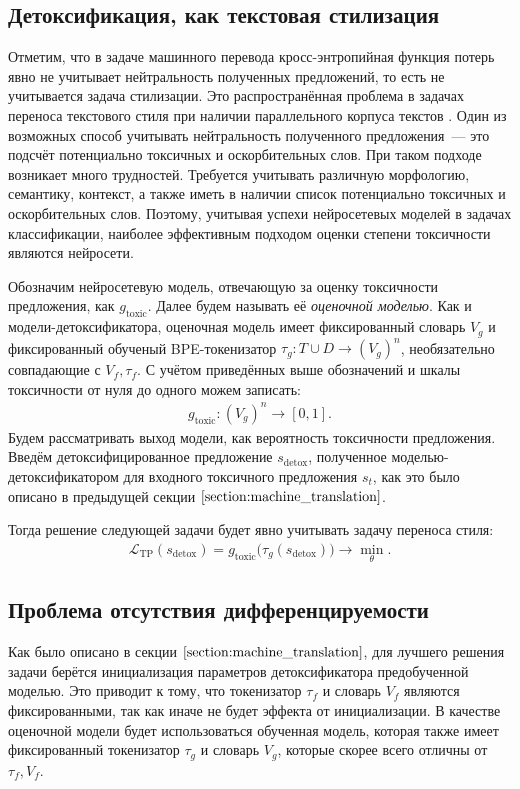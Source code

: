 \subsection{Детоксификация, как текстовая стилизация}
Отметим, что в задаче машинного перевода кросс-энтропийная функция потерь явно не учитывает нейтральность полученных предложений, то есть не учитывается задача стилизации.
Это распространённая проблема в задачах переноса текстового стиля при наличии параллельного корпуса текстов \cite{Tikhonov2018WhatIW}.
Один из возможных способ учитывать нейтральность полученного предложения~--- это подсчёт потенциально токсичных и оскорбительных слов. 
При таком подходе возникает много трудностей.
Требуется учитывать различную морфологию, семантику, контекст, а также иметь в наличии список потенциально токсичных и оскорбительных слов. 
Поэтому, учитывая успехи нейросетевых моделей в задачах классификации\cite{XLNet, devlin-etal-2019-bert}, наиболее эффективным подходом оценки степени токсичности являются нейросети.

Обозначим нейросетевую модель, отвечающую за оценку токсичности предложения, как $g_{\text{toxic}}$.
Далее будем называть её \textit{оценочной моделью}.
Как и модели-детоксификатора, оценочная модель имеет фиксированный словарь $V_{g}$ и фиксированный обученый BPE-токенизатор $\tau_{g}: T \cup D \to \left(V_{g}\right)^{n}$, необязательно совпадающие с $V_{f}, \tau_{f}$.
С учётом приведённых выше обозначений и шкалы токсичности от нуля до одного можем записать: 
\begin{gather*}
    g_{\text{toxic}}:\left(V_{g}\right)^{n} \to [0, 1].
\end{gather*}
Будем рассматривать выход модели, как вероятность токсичности предложения. 
Введём детоксифицированное предложение $s_{\text{detox}}$, полученное моделью-детоксификатором для входного токсичного предложения $s_t$, как это было описано в предыдущей секции $\ref{section:machine_translation}$.

Тогда решение следующей задачи будет явно учитывать задачу переноса стиля: 
\begin{gather*}
    \mathcal{L}_{\text{TP}} (s_{\text{detox}}) = g_{\text{toxic}} \bigl(\tau_{g} (s_{\text{detox}}) \bigr) \longrightarrow \min_{\theta}.   
\end{gather*}

\subsection{Проблема отсутствия дифференцируемости}
\label{section:problem_statement}
Как было описано в секции $\ref{section:machine_translation}$, для лучшего решения задачи берётся инициализация параметров детоксификатора предобученной моделью. 
Это приводит к тому, что токенизатор $\tau_{f}$ и словарь $V_{f}$ являются фиксированными, так как иначе не будет эффекта от инициализации. 
В качестве оценочной модели будет использоваться обученная модель, которая также имеет фиксированный токенизатор $\tau_{g}$ и словарь $V_{g}$, которые скорее всего отличны от $\tau_{f}, V_{f}$.

